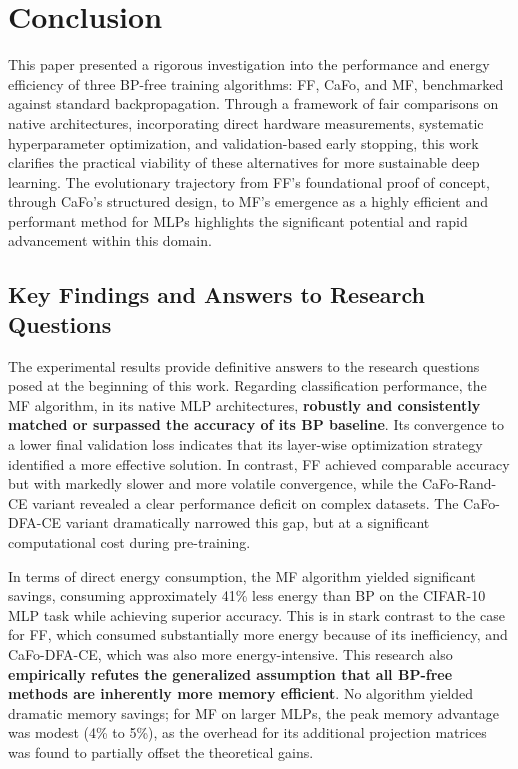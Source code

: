\section{Conclusion}
\label{chap:conclusion}

This paper presented a rigorous investigation into the performance and energy efficiency of three BP-free training algorithms: FF, CaFo, and MF, benchmarked against standard backpropagation. Through a framework of fair comparisons on native architectures, incorporating direct hardware measurements, systematic hyperparameter optimization, and validation-based early stopping, this work clarifies the practical viability of these alternatives for more sustainable deep learning. The evolutionary trajectory from FF's foundational proof of concept, through CaFo's structured design, to MF's emergence as a highly efficient and performant method for MLPs highlights the significant potential and rapid advancement within this domain.

\subsection{Key Findings and Answers to Research Questions}
\label{sec:conclusion_findings}

The experimental results provide definitive answers to the research questions posed at the beginning of this work. Regarding classification performance, the MF algorithm, in its native MLP architectures, \textbf{robustly and consistently matched or surpassed the accuracy of its BP baseline}. Its convergence to a lower final validation loss indicates that its layer-wise optimization strategy identified a more effective solution. In contrast, FF achieved comparable accuracy but with markedly slower and more volatile convergence, while the CaFo-Rand-CE variant revealed a clear performance deficit on complex datasets. The CaFo-DFA-CE variant dramatically narrowed this gap, but at a significant computational cost during pre-training.

In terms of direct energy consumption, the MF algorithm yielded significant savings, consuming approximately 41\% less energy than BP on the CIFAR-10 MLP task while achieving superior accuracy. This is in stark contrast to the case for FF, which consumed substantially more energy because of its inefficiency, and CaFo-DFA-CE, which was also more energy-intensive. This research also \textbf{empirically refutes the generalized assumption that all BP-free methods are inherently more memory efficient}. No algorithm yielded dramatic memory savings; for MF on larger MLPs, the peak memory advantage was modest (4\% to 5\%), as the overhead for its additional projection matrices was found to partially offset the theoretical gains.


